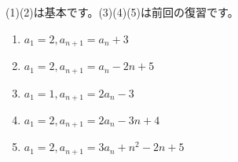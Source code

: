 \documentclass[12pt,a4paper]{jsarticle}
\begin{document}
(1)(2)は基本です。(3)(4)(5)は前回の復習です。
\begin{enumerate}
    \item $a_1=2, a_{n+1}=a_n +3$
    \item $a_1=2, a_{n+1}=a_n -2n+5$
    \item $a_1=1, a_{n+1}=2 a_n -3$
    \item $a_1=2, a_{n+1}=2 a_n -3n+4$
    \item $a_1=2, a_{n+1}=3a_n+n^2 -2n +5$
\end{enumerate}
\end{document}
